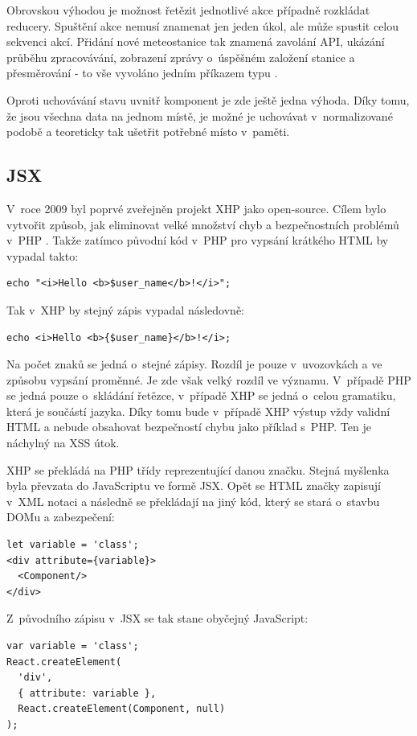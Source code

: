 Obrovskou výhodou je možnost řetězit jednotlivé akce případně rozkládat reducery. Spuštění akce nemusí znamenat jen jeden úkol, ale může spustit celou sekvenci akcí. Přidání nové meteostanice tak znamená zavolání API, ukázání průběhu zpracovávání, zobrazení zprávy o~úspěšném založení stanice a přesměrování - to vše vyvoláno jedním příkazem typu .

Oproti uchovávání stavu uvnitř komponent je zde ještě jedna výhoda. Díky tomu, že jsou všechna data na jednom místě, je možné je uchovávat v~normalizované podobě a teoreticky tak ušetřit potřebné místo v~paměti.

\subsection{JSX}
V~roce 2009 byl poprvé zveřejněn projekt XHP jako open-source. Cílem bylo vytvořit způsob, jak eliminovat velké množství chyb a bezpečnostních problémů v~PHP \cite{hhvm:xhp}. Takže zatímco původní kód v~PHP pro vypsání krát\-ké\-ho HTML by vypadal takto:
%
\begin{verbatim}
echo "<i>Hello <b>$user_name</b>!</i>";
\end{verbatim}
%
Tak v~XHP by stejný zápis vypadal následovně:
%
\begin{verbatim}
echo <i>Hello <b>{$user_name}</b>!</i>;
\end{verbatim}
%
Na počet znaků se jedná o~stejné zápisy. Rozdíl je pouze v~uvozovkách a ve způsobu vypsání proměnné. Je zde však velký rozdíl ve významu. V~případě PHP se jedná pouze o~skládání řetězce, v~případě XHP se jedná o~celou gramatiku, která je součástí jazyka. Díky tomu bude v~případě XHP výstup vždy validní HTML a nebude obsahovat bezpečností chybu jako příklad s~PHP. Ten je náchylný na XSS útok.

XHP se překládá na PHP třídy reprezentující danou značku. Stejná my\-š\-len\-ka byla převzata do JavaScriptu ve formě JSX. Opět se HTML značky zapisují v~XML notaci a následně se překládají na jiný kód, který se stará o~stavbu DOMu a zabezpečení:

\begin{verbatim}
let variable = 'class';
<div attribute={variable}>
  <Component/>
</div>
\end{verbatim}
%
Z~původního zápisu v~JSX se tak stane obyčejný JavaScript:
%
\begin{verbatim}
var variable = 'class';
React.createElement(
  'div',
  { attribute: variable },
  React.createElement(Component, null)
);
\end{verbatim}


